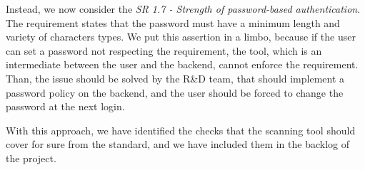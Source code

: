 Instead, we now consider the \textit{SR 1.7 - Strength of password-based authentication}. The requirement states that the password must have a minimum length and variety of characters types. We put this assertion in a limbo, because if the user can set a password not respecting the requirement, the tool, which is an intermediate between the user and the backend, cannot enforce the requirement. Than, the issue should be solved by the R\&D team, that should implement a password policy on the backend, and the user should be forced to change the password at the next login.

With this approach, we have identified the checks that the scanning tool should cover for sure from the standard, and we have included them in the backlog of the project.

